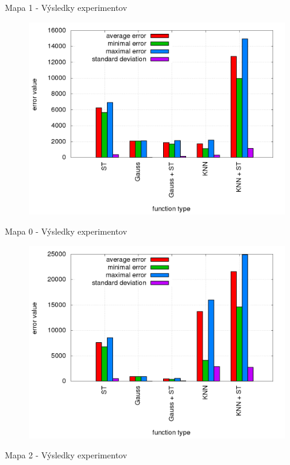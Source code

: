 Mapa 1 - Výsledky experimentov

\begin{figure}[!htb]
\centering
\includegraphics[scale=.4]{../../results_q_learning/map_1/trials_average_results.png}
\end{figure}



Mapa 0 - Výsledky experimentov

\begin{figure}[!htb]
\centering
\includegraphics[scale=.4]{../../results_q_learning/map_0/trials_average_results.png}
\end{figure}


Mapa 2 - Výsledky experimentov

